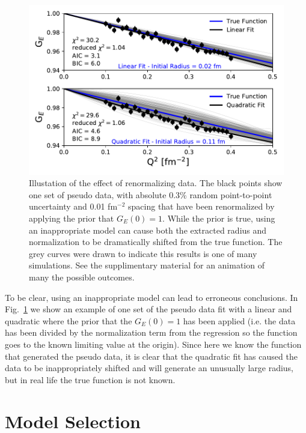 \documentclass[10pt,aps,prc,twocolumn]{revtex4-1}
\begin{document}
\begin{figure}[htb]
\includegraphics[width=\columnwidth]{Figure/linearVSquadratic-band.pdf}
\caption{Illustation of the effect of renormalizing data.  The
black points show one set of pseudo data, with absolute 0.3\% random point-to-point 
uncertainty and 0.01 fm$^{-2}$ spacing that have been renormalized
by applying the prior that $G_E(0)=1$.    While the prior is true, using an inappropriate model
can cause both the extracted radius and normalization to be dramatically shifted from the true
function.   The grey curves were drawn to indicate this results is one of many simulations.   
See the supplimentary material for an animation of many the possible outcomes.}  
\label{linearVSquadratic}
\end{figure}

To be clear, using an inappropriate model can lead to erroneous conclusions.
In Fig.~\ref{linearVSquadratic} we show an
example of one set of the pseudo data fit with a linear and quadratic where the prior that the
$G_E(0)=1$ has been applied (i.e. the data has been divided by the normalization term from the regression
so the function goes to the known limiting value at the origin).
Since here we know the function that generated the pseudo data, it is clear that the quadratic
fit has caused the data to be inappropriately shifted and will generate an unusually large radius, 
but in real life the true function is not known.


\section{Model Selection}
\end{document}
